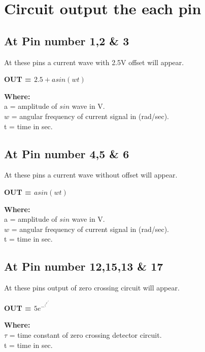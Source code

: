 \documentclass[a4paper,12pt,oneside]{book}
\begin{document}
\section{Circuit output the each pin}
\subsection*{At Pin number 1,2 \& 3}
At these pins a current wave with 2.5V offset will appear.\\
	\begin{center}
		\textbf{OUT = $2.5 + asin(wt)$}
	\end{center}
	\begin{flushleft}
		\textbf{Where:}\\
			a = amplitude of $sin$ wave in V.\\
			$w$ = angular frequency of current signal in (rad/sec).\\
			t = time in sec.\\
	\end{flushleft}
	
\subsection*{At Pin number 4,5 \& 6}
At these pins a current wave without offset will appear.\\
\begin{center}
	\textbf{OUT = $asin(wt)$}
\end{center}
\begin{flushleft}
	\textbf{Where:}\\
	a = amplitude of $sin$ wave in V.\\
	$w$ = angular frequency of current signal in (rad/sec).\\
	t = time in sec.\\
\end{flushleft}

\subsection*{At Pin number 12,15,13 \& 17}
At these pins output of zero crossing circuit will appear.\\
\begin{center}
	\textbf{OUT = $5e^-^(^t^/^\tau^)$}
\end{center}
\begin{flushleft}
	\textbf{Where:}\\
	$\tau$ = time constant of zero crossing detector circuit.\\
	t = time in sec.\\
\end{flushleft}
\end{document}
